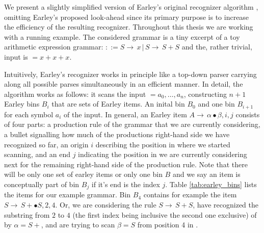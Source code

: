 %
\begin{isabellebody}%
%
%
\isadelimtheory
%
\endisadelimtheory
%
\isatagtheory
%
\endisatagtheory
{\isafoldtheory}%
%
\isadelimtheory
%
\endisadelimtheory
%
\isadelimdocument
%
\endisadelimdocument
%
\isatagdocument
%
\isamarkuptrue%
%
\endisatagdocument
{\isafolddocument}%
%
\isadelimdocument
%
\endisadelimdocument
%
\begin{isamarkuptext}%
We present a slightly simplified version of Earley's original recognizer algorithm \cite{Earley:1970},
omitting Earley's proposed look-ahead since its primary purpose is to increase the efficiency of the
resulting recognizer. Throughout this thesis we are working with a running example. The considered grammar is a tiny excerpt of a toy
arithmetic expression grammar: \isa{{\isasymG}} $::= S \rightarrow \, x \, \vert \, S \rightarrow \, S + S$ and
the, rather trivial, input is \isa{{\isasymomega}} $= x + x + x$.

Intuitively, Earley's recognizer works in principle like a top-down parser carrying along all possible
parses simultaneously in an efficient manner.
In detail, the algorithm works as follows: it scans the input \isa{{\isasymomega}} $=a_0,\dots,a_n$, constructing
$n+1$ Earley bins $B_i$ that are sets of Earley items. An inital bin $B_0$ and one bin $B_{i+1}$ for
each symbol $a_i$ of the input.
In general, an Earley item $A \rightarrow \, \alpha \bullet \beta, i, j$ consists of four parts: a production rule of the grammar that we are currently
considering, a bullet signalling how much of the productions right-hand side we have recognized so far,
an origin $i$ describing the position in \isa{{\isasymomega}} where we started scanning, and an end $j$ indicating
the position in \isa{{\isasymomega}} we are currently considering next for the remaining right-hand side of the production rule.
Note that there will be only one set of earley items or only one bin $B$ and we say an item is conceptually part of bin $B_j$ if it's end is the index $j$.
Table \ref{tab:earley_bins} lists the items for our example grammar. Bin $B_4$ contains for example the item $S \rightarrow \, S + \bullet S, 2, 4$.
Or, we are considering the rule $S \rightarrow \, S + S$, have recognized the substring from $2$ to $4$ (the first index being
inclusive the second one exclusive) of \isa{{\isasymomega}} by $\alpha = S +$, and are trying to scan $\beta = S$ from position 4 in \omega. 


\end{isamarkuptext}
\end{isabellebody}
